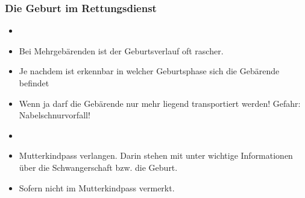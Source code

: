 \subsubsection{Die Geburt im Rettungsdienst}

{%
\begin{itemize}
  \item {}
  \item {} Bei
  Mehrgebärenden ist der Geburtsverlauf oft rascher.
  \item {} Je
  nachdem ist erkennbar in welcher Geburtsphase sich die Gebärende befindet
  \item {} Wenn ja
  darf die Gebärende nur mehr liegend transportiert werden! Gefahr: Nabelschnurvorfall!
  \item {}
  \item Mutterkindpass verlangen. Darin stehen mit
  unter wichtige Informationen über die Schwangerschaft bzw. die  Geburt.
  \item {} Sofern nicht im Mutterkindpass vermerkt.
\end{itemize}
}{}{}{}{}


